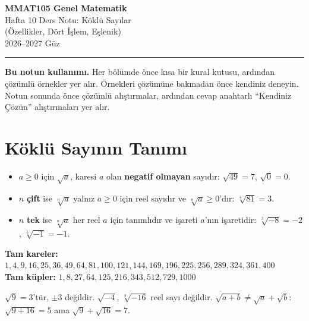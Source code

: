 \documentclass[11pt,a4paper]{article}
\begin{document}
\begin{minipage}[c]{\textwidth}
{\LARGE\bfseries\color{anamavi} MMAT105 Genel Matematik}\\[4pt]
{\large Hafta 10 Ders Notu: Köklü Sayılar\\ (Özellikler, Dört İşlem, Eşlenik)}\\[6pt]
{\small 2026--2027 Güz}
\end{minipage}

\vspace{4pt}\noindent\textcolor{anamavi}{\rule{\textwidth}{1pt}}

\textbf{Bu notun kullanımı.} Her bölümde önce kısa bir kural kutusu, ardından çözümlü örnekler yer alır. Örnekleri çözümüne bakmadan önce kendiniz deneyin. Notun sonunda önce çözümlü alıştırmalar, ardından cevap anahtarlı ``Kendiniz Çözün'' alıştırmaları yer alır.

\section{Köklü Sayının Tanımı}

\begin{kural}
\begin{itemize}[leftmargin=*,itemsep=1pt]
\item \(a\ge 0\) için \(\sqrt{a}\), karesi \(a\) olan \textbf{negatif olmayan} sayıdır: \(\sqrt{49}=7\), \(\sqrt{0}=0\).
\item \(n\) \textbf{çift} ise \(\sqrt[n]{a}\) yalnız \(a\ge 0\) için reel sayıdır ve \(\sqrt[n]{a}\ge 0\)'dır: \(\sqrt[4]{81}=3\).
\item \(n\) \textbf{tek} ise \(\sqrt[n]{a}\) her reel \(a\) için tanımlıdır ve işareti \(a\)'nın işaretidir: \(\sqrt[3]{-8}=-2\), \(\sqrt[5]{-1}=-1\).
\end{itemize}
\textbf{Tam kareler:} \(1,4,9,16,25,36,49,64,81,100,121,144,169,196,225,256,289,324,361,400\)\\
\textbf{Tam küpler:} \(1,8,27,64,125,216,343,512,729,1000\)
\end{kural}

\begin{dikkat}
\(\sqrt{9}=3\)'tür, \(\pm 3\) değildir. \(\sqrt{-4}\), \(\sqrt[4]{-16}\) reel sayı değildir. \(\sqrt{a+b}\neq\sqrt a+\sqrt b\): \(\sqrt{9+16}=5\) ama \(\sqrt9+\sqrt{16}=7\).
\end{dikkat}
\end{document}
